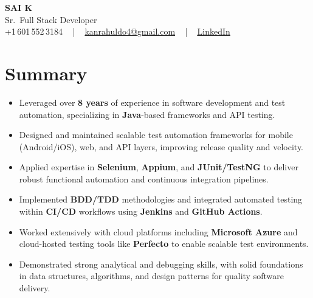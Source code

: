 \documentclass[letterpaper,11pt]{article}
\newcommand{\resumeItem}[1]{
  \item\footnotesize{
    {#1 \vspace{-2pt}}
  }
}
\newcommand{\resumeItemListStart}{\begin{itemize}[leftmargin=*]}
\newcommand{\resumeItemListEnd}{\end{itemize}\vspace{-5pt}}
\begin{document}
\begin{center}
    {\fontsize{14pt}{12pt}\selectfont \textbf{\MakeUppercase{Sai K}}}\\ \vspace{2pt}
    \fontsize{10pt}{12pt}\selectfont Sr.\ Full Stack Developer\\ \vspace{2pt}
    \fontsize{10pt}{12pt}\selectfont +1\,601\,552\,3184 ~ | ~
    \href{mailto:kanrahuldo4@gmail.com}{kanrahuldo4@gmail.com} ~ | ~
    \href{https://www.linkedin.com/in/srrrk/}{\color{blue}\underline{LinkedIn}}
    \vspace{-10pt}
\end{center}

\section{Summary}
\fontsize{9pt}{10pt}\selectfont
\resumeItemListStart
  \resumeItem{Leveraged over \textbf{8 years} of experience in software development and test automation, specializing in \textbf{Java}-based frameworks and API testing.}
  \resumeItem{Designed and maintained scalable test automation frameworks for mobile (Android/iOS), web, and API layers, improving release quality and velocity.}
  \resumeItem{Applied expertise in \textbf{Selenium}, \textbf{Appium}, and \textbf{JUnit/TestNG} to deliver robust functional automation and continuous integration pipelines.}
  \resumeItem{Implemented \textbf{BDD/TDD} methodologies and integrated automated testing within \textbf{CI/CD} workflows using \textbf{Jenkins} and \textbf{GitHub Actions}.}
  \resumeItem{Worked extensively with cloud platforms including \textbf{Microsoft Azure} and cloud-hosted testing tools like \textbf{Perfecto} to enable scalable test environments.}
  \resumeItem{Demonstrated strong analytical and debugging skills, with solid foundations in data structures, algorithms, and design patterns for quality software delivery.}
\resumeItemListEnd
\vspace{-6pt}

\end{document}
